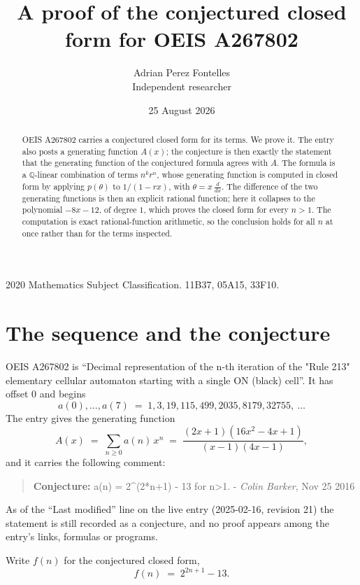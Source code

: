 \documentclass[11pt,a4paper]{article}
\title{A proof of the conjectured closed form for OEIS A267802}
\author{Adrian Perez Fontelles\\ \small Independent researcher}
\date{25 August 2026}
\theoremstyle{plain}
\theoremstyle{definition}
\begin{document}
\maketitle

\begin{abstract}
OEIS A267802 carries a conjectured closed form for its terms. We prove it. The entry
also posts a generating function $A(x)$; the conjecture is then exactly the statement
that the generating function of the conjectured formula agrees with $A$. The formula is
a $\mathbb{Q}$-linear combination of terms $n^{k}r^{n}$, whose generating function is
computed in closed form by applying $p(\theta)$ to $1/(1-rx)$, with
$\theta=x\,\frac{d}{dx}$. The difference of the two generating functions is then an
explicit rational function; here it collapses to the polynomial $- 8 x - 12$, of degree
$1$, which proves the closed form for every $n>1$. The computation is exact
rational-function arithmetic, so the conclusion holds for all $n$ at once rather than
for the terms inspected.
\end{abstract}

\noindent\small 2020 Mathematics Subject Classification. 11B37, 05A15, 33F10.\normalsize

\section{The sequence and the conjecture}

OEIS A267802 is ``Decimal representation of the n-th iteration of the "Rule 213" elementary cellular automaton starting with a single ON (black) cell''. It has offset $0$ and begins
\[
a(0),\dots,a(7)\;=\;1, 3, 19, 115, 499, 2035, 8179, 32755,\ \dots
\]
The entry gives the generating function
\begin{equation}\label{eq:gf}
A(x)\;=\;\sum_{n\ge 0} a(n)\,x^{n}\;=\;\frac{\left(2 x + 1\right) \left(16 x^{2} - 4 x + 1\right)}{\left(x - 1\right) \left(4 x - 1\right)} ,
\end{equation}
and it carries the following comment:
\begin{quote}\small
\textbf{Conjecture:} a(n) = 2\^{}(2*n+1) - 13 for n>1. - \emph{Colin Barker}, Nov 25 2016
\end{quote}
As of the ``Last modified'' line on the live entry (2025-02-16, revision 21) the
statement is still recorded as a conjecture, and no proof appears among the entry's links,
formulas or programs.

Write $f(n)$ for the conjectured closed form,
\[
f(n)\;=\;2^{2 n + 1} - 13 .
\]
\end{document}
